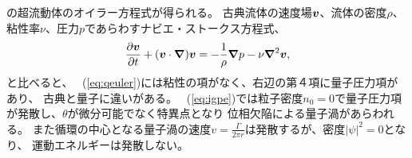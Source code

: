 \documentclass[12pt,a4paper]{jbook}
\def\Vec#1{\mbox{\boldmath $#1$}}			%
\begin{document}
        の超流動体のオイラー方程式が得られる。
        古典流体の速度場$\Vec{v}$、流体の密度$\rho$、粘性率$\nu$、圧力$p$であらわすナビエ・ストークス方程式、
        \begin{eqnarray}
            \label{eq:ns}
            \frac{\partial \Vec{v}}{\partial t}
            + (\Vec{v} \cdot \Vec{\nabla}) \Vec{v} = 
            - \frac{1}{\rho} \Vec{\nabla} p - \nu \Vec{\nabla}^2 \Vec{v},
        \end{eqnarray}
        と比べると、
        ~(\ref{eq:qeuler})には粘性の項がなく、右辺の第４項に量子圧力項があり、
        古典と量子に違いがある。
        ~(\ref{eq:igpe})では粒子密度$n_0=0$で量子圧力項が発散し、$\theta$が微分可能でなく特異点となり
        位相欠陥による量子渦があらわれる。
        また循環の中心となる量子渦の速度$v = \frac{\Gamma}{2 \pi r}$は発散するが、密度$|\psi|^2=0$となり、
        運動エネルギーは発散しない。
\end{document}

